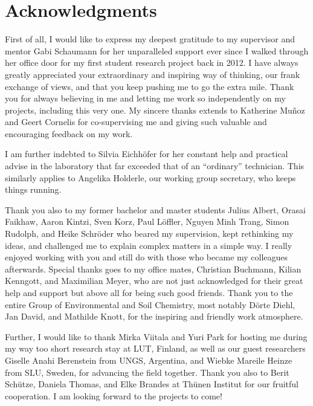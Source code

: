 
\chapter{Acknowledgments}

First of all, I would like to express my deepest gratitude to my supervisor and mentor Gabi Schaumann for her unparalleled support ever since I walked through her office door for my first student research project back in 2012. I have always greatly appreciated your extraordinary and inspiring way of thinking, our frank exchange of views, and that you keep pushing me to go the extra mile. Thank you for always believing in me and letting me work so independently on my projects, including this very one.
My sincere thanks extends to Katherine Muñoz and Geert Cornelis for co-supervising me and giving such valuable and encouraging feedback on my work.

I am further indebted to Silvia Eichhöfer for her constant help and practical advise in the laboratory that far exceeded that of an ``ordinary'' technician. This similarly applies to Angelika Holderle, our working group secretary, who keeps things running.

Thank you also to my former bachelor and master students Julius Albert, Orasai Faikhaw, Aaron Kintzi, Sven Korz, Paul Löffler, Nguyen Minh Trang, Simon Rudolph, and Heike Schröder who beared my supervision, kept rethinking my ideas, and challenged me to explain complex matters in a simple way. I really enjoyed working with you and still do with those who became my colleagues afterwards.
Special thanks goes to my office mates, Christian Buchmann, Kilian Kenngott, and Maximilian Meyer, who are not just acknowledged for their great help and support but above all for being such good friends. Thank you to the entire Group of Environmental and Soil Chemistry, most notably Dörte Diehl, Jan David, and Mathilde Knott, for the inspiring and friendly work atmosphere.

Further, I would like to thank Mirka Viitala and Yuri Park for hosting me during my way too short research stay at LUT, Finland, as well as our guest researchers Giselle Anahi Berenstein from UNGS, Argentina, and Wiebke Mareile Heinze from SLU, Sweden, for advancing the field together. Thank you also to Berit Schütze, Daniela Thomas, and Elke Brandes at \foreignlanguage{ngerman}{Thünen Institut} for our fruitful cooperation. I am looking forward to the projects to come!

